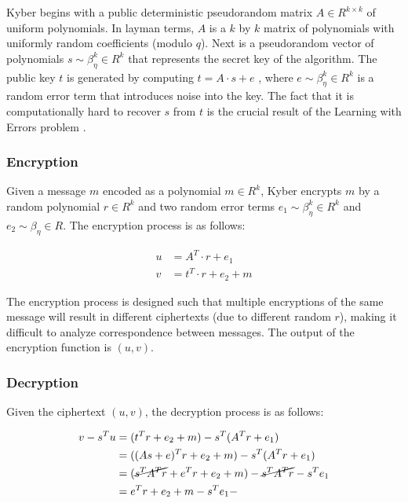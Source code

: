 Kyber begins with a public deterministic pseudorandom matrix $A \in R^{k \times k}$ of uniform polynomials. In layman terms, $A$ is a $k$ by $k$ matrix of polynomials with uniformly random coefficients (modulo $q$). Next is a pseudorandom vector of polynomials $s \sim \beta_\eta^k \in R^k$ that represents the secret key of the algorithm. The public key $t$ is generated by computing $t = A \cdot s + e$ \cite{crystals-kyber}, where $e \sim \beta_\eta^k \in R^k$ is a random error term that introduces noise into the key. The fact that it is computationally hard to recover $s$ from $t$ is the crucial result of the Learning with Errors problem \cite{lwe}.

\subsubsection*{Encryption}

Given a message $m$ encoded as a polynomial $m \in R^k$, Kyber encrypts $m$ by a random polynomial $r \in R^k$ and two random error terms $e_1 \sim \beta_\eta^k \in R^k$ and $e_2 \sim \beta_\eta \in R$. The encryption process is as follows:

\begin{align*}
  u & = A^T \cdot r + e_1     \\
  v & = t^T \cdot r + e_2 + m
\end{align*}

The encryption process is designed such that multiple encryptions of the same message will result in different ciphertexts (due to different random $r$), making it difficult to analyze correspondence between messages. The output of the encryption function is $(u, v)$.

\subsubsection*{Decryption}

Given the ciphertext $(u, v)$, the decryption process is as follows:

\begin{align*}
  v - s^Tu & = (t^Tr + e_2 + m) - s^T (A^Tr + e_1)                              \\
           & = ((As + e)^Tr + e_2 + m) - s^T (A^Tr + e_1)                       \\
           & = (\cancel{s^TA^Tr} + e^Tr + e_2 + m) - \cancel{s^T A^Tr} - s^Te_1 \\
           & = e^Tr + e_2 + m - s^Te_1-
\end{align*}

